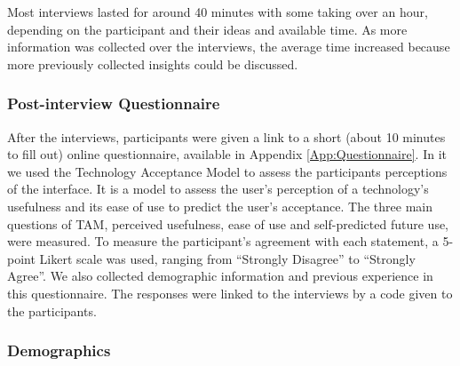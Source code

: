 \documentclass[a4paper,11pt,twoside]{article}
\theoremstyle{definition} %
\renewcommand{\cite}[1]{\citep{#1}}
\begin{document}
Most interviews lasted for around 40 minutes with some taking over an hour, depending on the participant and their ideas and available time. As more information was collected over the interviews, the average time increased because more previously collected insights could be discussed. 


\subsubsection{Post-interview Questionnaire} \label{SubSubSec:Questionnaire}

After the interviews, participants were given a link to a short (about 10 minutes to fill out) online questionnaire, available in Appendix \ref{App:Questionnaire}. In it we used the Technology Acceptance Model \cite{davis-1989} to assess the participants perceptions of the interface. It is a model to assess the user's perception of a technology’s usefulness and its ease of use to predict the user's acceptance. The three main questions of TAM, perceived usefulness, ease of use and self-predicted future use, were measured. To measure the participant’s agreement with each statement, a 5-point Likert scale was used, ranging from “Strongly Disagree” to “Strongly Agree”. We also collected demographic information and previous experience in this questionnaire. The responses were linked to the interviews by a code given to the participants. 


\subsubsection{Demographics} \label{SubSubSec:Demographics}
\end{document}
